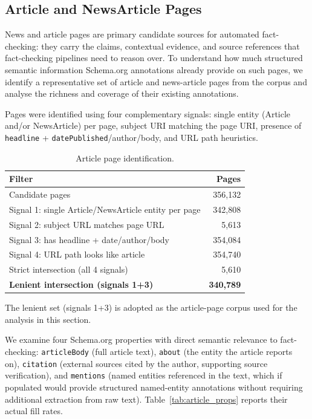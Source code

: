 \documentclass[11pt,a4paper]{article}
\begin{document}
\subsection{Article and NewsArticle Pages}
\label{subsec:art_analysis}

News and article pages are primary candidate sources for
automated fact-checking: they carry the claims, contextual evidence, and
source references that fact-checking pipelines need to reason over.
To understand how much structured semantic information Schema.org annotations
already provide on such pages, we identify a representative set of article and
news-article pages from the corpus and analyse the richness and coverage of
their existing annotations.

Pages were identified using four complementary signals: single entity (Article and/or NewsArticle) per
page, subject URI matching the page URI, presence of
\texttt{headline} + \texttt{datePublished}/author/body, and URL path
heuristics.

\begin{table}[H]
\centering
\caption{Article page identification.}
\label{tab:article_id}
\begin{tabular}{lr}
\toprule
\textbf{Filter} & \textbf{Pages} \\
\midrule
Candidate pages & 356{,}132 \\
Signal 1: single Article/NewsArticle entity per page & 342{,}808 \\
Signal 2: subject URL matches page URL & 5{,}613 \\
Signal 3: has headline + date/author/body & 354{,}084 \\
Signal 4: URL path looks like article & 354{,}740 \\
\midrule
Strict intersection (all 4 signals) & 5{,}610 \\
\textbf{Lenient intersection (signals 1+3)} & \textbf{340{,}789} \\
\bottomrule
\end{tabular}
\end{table}


The lenient set (signals 1+3) is adopted as the article-page
corpus used for the analysis in this section.

We examine four Schema.org properties with
direct semantic relevance to fact-checking: \texttt{articleBody} (full article
text), \texttt{about} (the
entity the article reports on), \texttt{citation} (external sources cited by the author, supporting
source verification), and \texttt{mentions} (named entities referenced in the
text, which if populated would provide structured named-entity annotations
without requiring additional extraction from raw text).
Table~\ref{tab:article_props} reports their actual fill rates.
\end{document}
